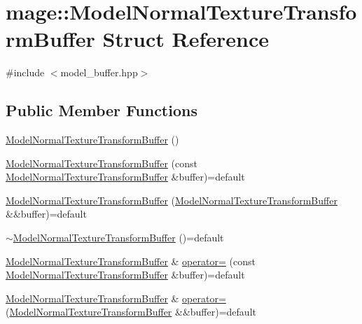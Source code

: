 \hypertarget{structmage_1_1_model_normal_texture_transform_buffer}{}\section{mage\+:\+:Model\+Normal\+Texture\+Transform\+Buffer Struct Reference}
\label{structmage_1_1_model_normal_texture_transform_buffer}


{\ttfamily \#include $<$model\+\_\+buffer.\+hpp$>$}

\subsection*{Public Member Functions}
\begin{DoxyCompactItemize}
\item 
\hyperlink{structmage_1_1_model_normal_texture_transform_buffer_ad419df3f0977a4d9185489c19e2237b6}{Model\+Normal\+Texture\+Transform\+Buffer} ()
\item 
\hyperlink{structmage_1_1_model_normal_texture_transform_buffer_abf62d5e6d36c5a012907933d9f5cdcd8}{Model\+Normal\+Texture\+Transform\+Buffer} (const \hyperlink{structmage_1_1_model_normal_texture_transform_buffer}{Model\+Normal\+Texture\+Transform\+Buffer} \&buffer)=default
\item 
\hyperlink{structmage_1_1_model_normal_texture_transform_buffer_a8d35262220485ab7657991f93553a52c}{Model\+Normal\+Texture\+Transform\+Buffer} (\hyperlink{structmage_1_1_model_normal_texture_transform_buffer}{Model\+Normal\+Texture\+Transform\+Buffer} \&\&buffer)=default
\item 
\hyperlink{structmage_1_1_model_normal_texture_transform_buffer_a5b37f45ead4f5b40e2d9de8ef116a057}{$\sim$\+Model\+Normal\+Texture\+Transform\+Buffer} ()=default
\item 
\hyperlink{structmage_1_1_model_normal_texture_transform_buffer}{Model\+Normal\+Texture\+Transform\+Buffer} \& \hyperlink{structmage_1_1_model_normal_texture_transform_buffer_a5ce1f572ceecdb53b66d6f3f8f03e5f8}{operator=} (const \hyperlink{structmage_1_1_model_normal_texture_transform_buffer}{Model\+Normal\+Texture\+Transform\+Buffer} \&buffer)=default
\item 
\hyperlink{structmage_1_1_model_normal_texture_transform_buffer}{Model\+Normal\+Texture\+Transform\+Buffer} \& \hyperlink{structmage_1_1_model_normal_texture_transform_buffer_aa5c10733681849e37988a9d1bf75a637}{operator=} (\hyperlink{structmage_1_1_model_normal_texture_transform_buffer}{Model\+Normal\+Texture\+Transform\+Buffer} \&\&buffer)=default
\end{DoxyCompactItemize}
